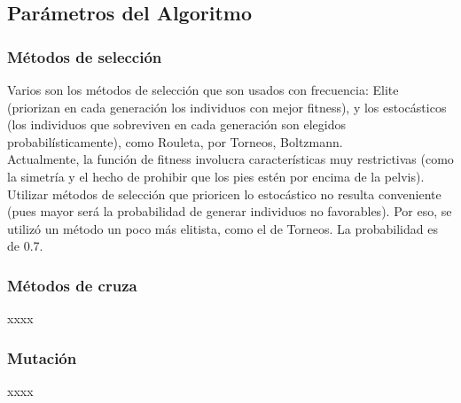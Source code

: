 \documentclass{article}
\begin{document}




\subsection{Par\'ametros del Algoritmo}

\subsubsection{M\'etodos de selecci\'on}
\label{metodos de seleccion}
Varios son los m\'etodos de selecci\'on que son usados con frecuencia: Elite (priorizan en cada generaci\'on los individuos con mejor fitness), y los estoc\'asticos (los individuos que sobreviven en cada generaci\'on  son elegidos probabil\'isticamente), como Rouleta, por Torneos, Boltzmann. \\
Actualmente, la funci\'on de fitness involucra caracter\'isticas muy restrictivas (como la simetr\'ia y el hecho de prohibir que los pies est\'en por encima de la pelvis). Utilizar m\'etodos de selecci\'on que prioricen lo estoc\'astico no resulta conveniente (pues mayor ser\'a la probabilidad de generar individuos no favorables). Por eso, se utiliz\'o un m\'etodo un poco m\'as elitista, como el de Torneos. La probabilidad es de 0.7.

\subsubsection{M\'etodos de cruza}
\label{metodos de cruza}
xxxx

\subsubsection{Mutaci\'on}
\label{mutacion}
xxxx
\end{document}
